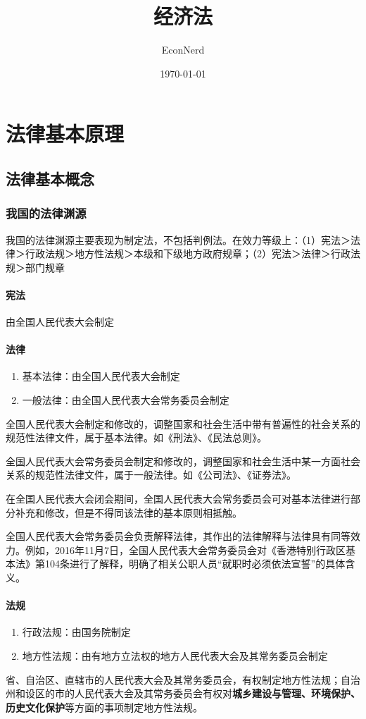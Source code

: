 \documentclass[UTF8,12pt]{ctexart}
\title{经济法} %
\author{EconNerd}
\date{\today}
\numberwithin{equation}{section} %
\numberwithin{figure}{section}
\numberwithin{table}{section}
\begin{document}
	\maketitle
	\tableofcontents
	\newpage
	
	\section{法律基本原理}
	
	\subsection{法律基本概念}
	\subsubsection{我国的法律渊源}
	我国的法律渊源主要表现为制定法，不包括判例法。在效力等级上：（1）宪法＞法律＞行政法规＞地方性法规＞本级和下级地方政府规章；（2）宪法＞法律＞行政法规＞部门规章
	
	\paragraph{宪法}由全国人民代表大会制定
	
	\paragraph{法律}
	\begin{enumerate}
		\item 基本法律：由全国人民代表大会制定
		
		\item 一般法律：由全国人民代表大会常务委员会制定
	\end{enumerate}
	全国人民代表大会制定和修改的，调整国家和社会生活中带有普遍性的社会关系的规范性法律文件，属于基本法律。如《刑法》、《民法总则》。
	
	全国人民代表大会常务委员会制定和修改的，调整国家和社会生活中某一方面社会关系的规范性法律文件，属于一般法律。如《公司法》、《证券法》。
	
	在全国人民代表大会闭会期间，全国人民代表大会常务委员会可对基本法律进行部分补充和修改，但是不得同该法律的基本原则相抵触。
	
	全国人民代表大会常务委员会负责解释法律，其作出的法律解释与法律具有同等效力。例如，2016年11月7日，全国人民代表大会常务委员会对《香港特别行政区基本法》第104条进行了解释，明确了相关公职人员“就职时必须依法宣誓”的具体含义。
	
	\paragraph{法规}
	\begin{enumerate}
		\item 行政法规：由国务院制定
		
		\item 地方性法规：由有地方立法权的地方人民代表大会及其常务委员会制定
	\end{enumerate}
	省、自治区、直辖市的人民代表大会及其常务委员会，有权制定地方性法规；自治州和设区的市的人民代表大会及其常务委员会有权对\textbf{城乡建设与管理、环境保护、历史文化保护}等方面的事项制定地方性法规。
	
\end{document}

